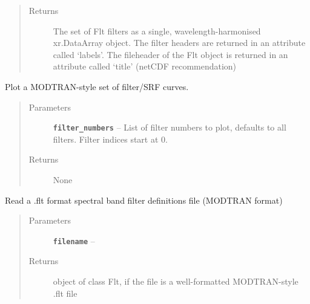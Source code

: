 \documentclass[a4paper,10pt,english]{sphinxmanual}
\begin{document}
\begin{fulllineitems}
\begin{fulllineitems}
\begin{quote}
\begin{description}
\begin{itemize}
\end{itemize}

\item[{Returns}] \leavevmode
The set of Flt filters as a single, wavelength-harmonised xr.DataArray object. The filter
headers are returned in an attribute called `labels'. The fileheader of the Flt object is
returned in an attribute called `title' (netCDF recommendation)

\end{description}\end{quote}

\end{fulllineitems}


\begin{fulllineitems}
\label{packages:radute.Flt.plot}
Plot a MODTRAN-style set of filter/SRF curves.
\begin{quote}\begin{description}
\item[{Parameters}] \leavevmode
\textbf{\texttt{filter\_numbers}} -- List of filter numbers to plot, defaults to all filters. Filter indices start at 0.

\item[{Returns}] \leavevmode
None

\end{description}\end{quote}

\end{fulllineitems}


\begin{fulllineitems}
\label{packages:radute.Flt.read}
Read a .flt format spectral band filter definitions file (MODTRAN format)
\begin{quote}\begin{description}
\item[{Parameters}] \leavevmode
\textbf{\texttt{filename}} -- 

\item[{Returns}] \leavevmode
object of class Flt, if the file is a well-formatted MODTRAN-style .flt file

\end{description}\end{quote}


\end{fulllineitems}
\end{fulllineitems}
\end{document}
